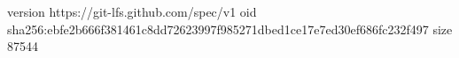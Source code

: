 version https://git-lfs.github.com/spec/v1
oid sha256:ebfe2b666f381461c8dd72623997f985271dbed1ce17e7ed30ef686fc232f497
size 87544
